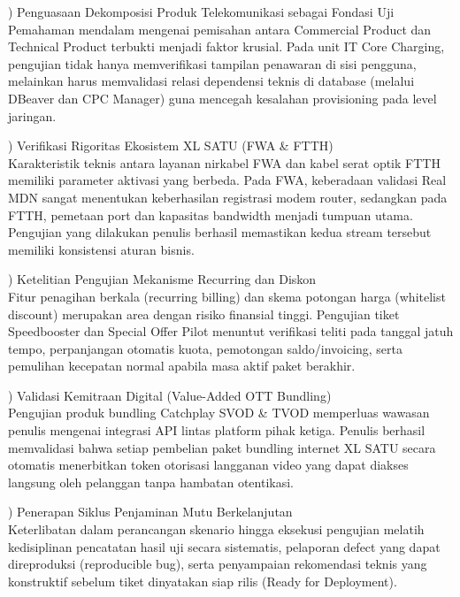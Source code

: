 \documentclass[12pt,a4paper]{article}
\begin{document}
\vspace{0.3cm}
) Penguasaan Dekomposisi Produk Telekomunikasi sebagai Fondasi Uji\\
Pemahaman mendalam mengenai pemisahan antara Commercial Product dan Technical Product terbukti menjadi faktor krusial. Pada unit IT Core Charging, pengujian tidak hanya memverifikasi tampilan penawaran di sisi pengguna, melainkan harus memvalidasi relasi dependensi teknis di database (melalui DBeaver dan CPC Manager) guna mencegah kesalahan provisioning pada level jaringan.

\clearpage
{}) Verifikasi Rigoritas Ekosistem XL SATU (FWA \& FTTH)\\
Karakteristik teknis antara layanan nirkabel FWA dan kabel serat optik FTTH memiliki parameter aktivasi yang berbeda. Pada FWA, keberadaan validasi Real MDN sangat menentukan keberhasilan registrasi modem router, sedangkan pada FTTH, pemetaan port dan kapasitas bandwidth menjadi tumpuan utama. Pengujian yang dilakukan penulis berhasil memastikan kedua stream tersebut memiliki konsistensi aturan bisnis.

\vspace{0.2cm}
) Ketelitian Pengujian Mekanisme Recurring dan Diskon\\
Fitur penagihan berkala (recurring billing) dan skema potongan harga (whitelist discount) merupakan area dengan risiko finansial tinggi. Pengujian tiket Speedbooster dan Special Offer Pilot menuntut verifikasi teliti pada tanggal jatuh tempo, perpanjangan otomatis kuota, pemotongan saldo/invoicing, serta pemulihan kecepatan normal apabila masa aktif paket berakhir.

\vspace{0.2cm}
) Validasi Kemitraan Digital (Value-Added OTT Bundling)\\
Pengujian produk bundling Catchplay SVOD \& TVOD memperluas wawasan penulis mengenai integrasi API lintas platform pihak ketiga. Penulis berhasil memvalidasi bahwa setiap pembelian paket bundling internet XL SATU secara otomatis menerbitkan token otorisasi langganan video yang dapat diakses langsung oleh pelanggan tanpa hambatan otentikasi.

\vspace{0.2cm}
) Penerapan Siklus Penjaminan Mutu Berkelanjutan\\
Keterlibatan dalam perancangan skenario hingga eksekusi pengujian melatih kedisiplinan pencatatan hasil uji secara sistematis, pelaporan defect yang dapat direproduksi (reproducible bug), serta penyampaian rekomendasi teknis yang konstruktif sebelum tiket dinyatakan siap rilis (Ready for Deployment).
\end{document}
